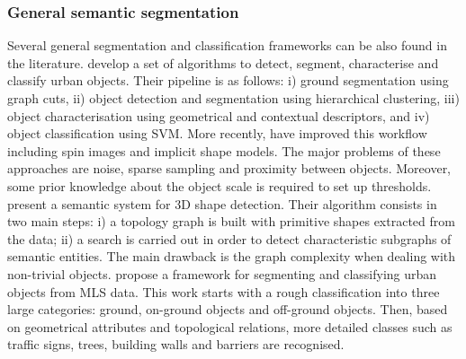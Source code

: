 \documentclass{kththesis}
\begin{document}
\subsubsection{General semantic segmentation}
Several general segmentation and classification frameworks can be also
found in the literature. \textcite{Golovinskiy2009} develop a set of algorithms
to detect, segment, characterise and classify urban objects.  Their pipeline is
as follows: i) ground segmentation using graph cuts, ii) object detection
and segmentation using hierarchical clustering, iii) object characterisation
using geometrical and contextual descriptors, and iv) object classification
using SVM. More recently, \textcite{Velizhev2012ImplicitSM} have improved this workflow
including spin images and implicit shape models. The major problems of
these approaches are noise, sparse sampling and proximity between objects.
Moreover, some prior knowledge about the object scale is required to set up
thresholds. \\
\textcite{Schnabel2012} present a semantic system for 3D shape
detection. Their algorithm consists in two main steps: i) a topology graph
is built with primitive shapes extracted from the data; ii) a search is carried
out in order to detect characteristic subgraphs of semantic entities. The
main drawback is the graph complexity when dealing with non-trivial objects.
\textcite{PU2011S28} propose a framework for segmenting and classifying
urban objects from MLS data. This work starts with a rough classification
into three large categories: ground, on-ground objects and off-ground objects.
Then, based on geometrical attributes and topological relations, more
detailed classes such as traffic signs, trees, building walls and barriers are
recognised. \\
\end{document}
